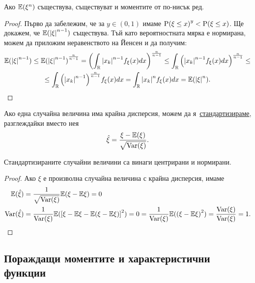 \documentclass[numbers=endperiod, DIV=15, bibliography=totocnumbered]{scrartcl}
\begin{document}
\begin{proposition}\label{thm:lower-order-moments}
  Ако $\mathbb{E}(\xi^n)$ съществува, съществуват и моментите от по-нисък ред.
\end{proposition}
\begin{proof}
  Първо да забележим, че за $y \in (0, 1)$ имаме ${\operatorname{P}(\xi \leq x)}^y < \operatorname{P}(\xi \leq x)$. Ще докажем, че $\mathbb{E}({\left\vert \xi \right\vert}^{n-1})$ съществува. Тъй като вероятностната мярка е нормирана, можем да приложим неравенството на Йенсен и да получим:
  \begin{multline*}
    \mathbb{E}({\left\vert \xi \right\vert}^{n-1})
    \leq
    {\mathbb{E}({\left\vert \xi \right\vert}^{n-1})}^{\frac n {n-1}}
    =
    {\left( \int_{\mathbb{R}} {\left\vert x_k \right\vert}^{n-1} f_\xi(x) dx \right)}^{\frac n {n-1}}
    \leq
    \int_{\mathbb{R}} {\left({\left\vert x_k \right\vert}^{n-1} f_\xi(x) dx \right)}^{\frac n {n-1}}
    \leq \\ \leq
    \int_{\mathbb{R}} {\left({\left\vert x_k \right\vert}^{n-1} \right)}^{\frac n {n-1}} f_\xi(x) dx
    =
    \int_{\mathbb{R}} {\left\vert x_k \right\vert}^n f_\xi(x) dx
    =
    \mathbb{E}({\left\vert \xi \right\vert}^n).
  \end{multline*}
\end{proof}

\begin{definition}
  Ако една случайна величина има крайна дисперсия, можем да я~\uline{стандартизираме}, разглеждайки вместо нея
  \begin{displaymath}
    \hat \xi = \frac {\xi - \mathbb{E}(\xi)} {\sqrt{\operatorname{Var}(\xi)}}.
  \end{displaymath}
\end{definition}

\begin{proposition}
  Стандартизираните случайни величини са винаги центрирани и нормирани.
\end{proposition}
\begin{proof}
  Ако $\xi$ е произволна случайна величина с крайна дисперсия, имаме
  \begin{align*}
    \mathbb{E}(\hat \xi)
    &=
    \frac 1 {\sqrt{\operatorname{Var}(\xi)}} \mathbb{E}(\xi - \mathbb{E}\xi)
    =
    0
    \\
    \operatorname{Var}(\hat \xi)
    &=
    \frac 1 {\operatorname{Var}(\xi)} \mathbb{E}({\left[ \xi - \mathbb{E}\xi - \mathbb{E}(\xi - \mathbb{E}\xi) \right]}^2) = 0
    =
    \frac 1 {\operatorname{Var}(\xi)} \mathbb{E}({(\xi - \mathbb{E}\xi)}^2)
    =
    \frac {\operatorname{Var}(\xi)} {\operatorname{Var}(\xi)}
    =
    1.
  \end{align*}
\end{proof}

\subsection{Пораждащи моментите и характеристични функции}
\end{document}

